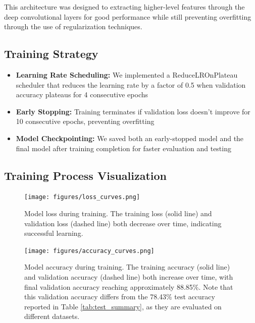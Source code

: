 \documentclass[10pt]{article}
\begin{document}
This architecture was designed to extracting higher-level features through the deep convolutional layers for good performance while still preventing overfitting through the use of regularization techniques.

\subsection{Training Strategy}

\begin{itemize}
    \item \textbf{Learning Rate Scheduling:} We implemented a ReduceLROnPlateau scheduler that reduces the learning rate by a factor of 0.5 when validation accuracy plateaus for 4 consecutive epochs
    
    \item \textbf{Early Stopping:} Training terminates if validation loss doesn't improve for 10 consecutive epochs, preventing overfitting
    
    \item \textbf{Model Checkpointing:} We saved both an early-stopped model and the final model after training completion for faster evaluation and testing
\end{itemize}

\subsection{Training Process Visualization}

\begin{figure}[H]
    \centering
    \texttt{[image: figures/loss\_curves.png]}
    \caption{Model loss during training. The training loss (solid line) and validation loss (dashed line) both decrease over time, indicating successful learning.}
    \label{fig:model_loss}
\end{figure}

\begin{figure}[H]
    \centering
    \texttt{[image: figures/accuracy\_curves.png]}
    \caption{Model accuracy during training. The training accuracy (solid line) and validation accuracy (dashed line) both increase over time, with final validation accuracy reaching approximately 88.85\%. Note that this validation accuracy differs from the 78.43\% test accuracy reported in Table \ref{tab:test_summary}, as they are evaluated on different datasets.}
    \label{fig:model_accuracy}
\end{figure}
\end{document}
